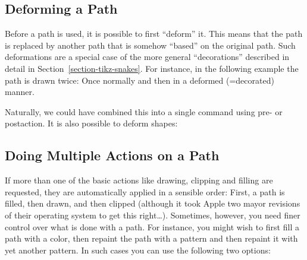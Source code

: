 \subsection{Deforming a Path}

Before a path is used, it is possible to first ``deform'' it. This
means that the path is replaced by another path that is somehow
``based'' on the original path. Such deformations are a special case
of the more general ``decorations'' described in detail in
Section~\ref{section-tikz-snakes}. For instance, in the following
example the path is drawn twice: Once normally and then in a deformed
(=decorated) manner.
\begin{codeexample}[]
\end{codeexample}

Naturally, we could have combined this into a single command using
pre- or postaction. It is also possible to deform shapes:
\begin{codeexample}[]
\end{codeexample}



\subsection{Doing Multiple Actions on a Path}

If more than one of the basic actions like drawing, clipping and
filling are requested, they are automatically applied in a sensible
order: First, a path is filled, then drawn, and then clipped (although
it took Apple two mayor revisions of their operating system to get
this right\dots). Sometimes, however, you need finer control over what
is done with a path. For instance, you might wish to first fill a path
with a color, then repaint the path with a pattern and then repaint it
with yet another pattern. In such cases you can use the following two
options:

